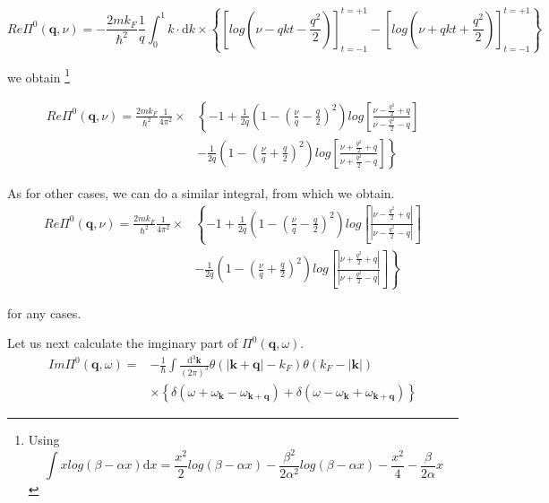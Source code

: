 \[Re \Pi^0(\mathbf{q},\nu)
= -\frac{2 m k_F}{\hbar^2} \frac{1}{q} \int_0^1 k \cdot \mathrm{d} k \times \left\{ 
\left[ log(\nu-q k t-\frac{q^2}{2}) \right]_{t=-1}^{t=+1} - \left[ log(\nu+q k t+\frac{q^2}{2}) \right]_{t=-1}^{t=+1}
 \right\}\]

we obtain
\footnote{Using
\[ \int x log(\beta-\alpha x) \mathrm{d}x = \frac{x^2}{2} log(\beta - \alpha x) - \frac{\beta^2}{2 \alpha^2} log(\beta - \alpha x) - \frac{x^2}{4}- \frac{\beta}{2\alpha}x \]}

\[ \begin{split}Re \Pi^0(\mathbf{q},\nu)
= \frac{2 m k_F}{\hbar^2} \frac{1}{4\pi^2} \times&\left\{ -1 + \frac{1}{2q}\left( 1-(\frac{\nu}{q}-\frac{q}{2})^2 \right) log\left[ \frac{\nu-\frac{q^2}{2}+q}{\nu-\frac{q^2}{2}-q} \right] \right. \\
&\left. -\frac{1}{2q}\left( 1-(\frac{\nu}{q}+\frac{q}{2})^2 \right) log\left[ \frac{\nu+\frac{q^2}{2}+q}{\nu+\frac{q^2}{2}-q} \right] \right\}
\end{split}\]

As for other cases, we can do a similar integral, from which we obtain.
\begin{equation} \label{Eqs2.8.20}
\begin{split}Re \Pi^0(\mathbf{q},\nu)
= \frac{2 m k_F}{\hbar^2} \frac{1}{4\pi^2} \times&\left\{ -1 + \frac{1}{2q}\left( 1-(\frac{\nu}{q}-\frac{q}{2})^2 \right) log\left[ \frac{|\nu-\frac{q^2}{2}+q|}{|\nu-\frac{q^2}{2}-q|} \right] \right. \\
&\left. -\frac{1}{2q}\left( 1-(\frac{\nu}{q}+\frac{q}{2})^2 \right) log\left[ \frac{|\nu+\frac{q^2}{2}+q|}{|\nu+\frac{q^2}{2}-q|} \right] \right\}
\end{split}
\end{equation}

for any cases.

Let us next calculate the imginary part of $\Pi^0(\mathbf{q},\omega)$.
\begin{equation*} \tag{2.8.16} \begin{split}
Im \Pi^0(\mathbf{q},\omega) =& -\frac{1}{\hbar} \int \frac{\mathrm{d}^3 \mathbf{k}}{(2\pi)^3} \theta(|\mathbf{k}+\mathbf{q}|-k_F)\theta(k_F - |\mathbf{k}|)\\
& \times \left\{ \delta(\omega+\omega_{\mathbf{k}}- \omega_{\mathbf{k}+\mathbf{q}}) + \delta(\omega-\omega_{\mathbf{k}}+ \omega_{\mathbf{k}+\mathbf{q}}) \right\}
\end{split}\end{equation*}

